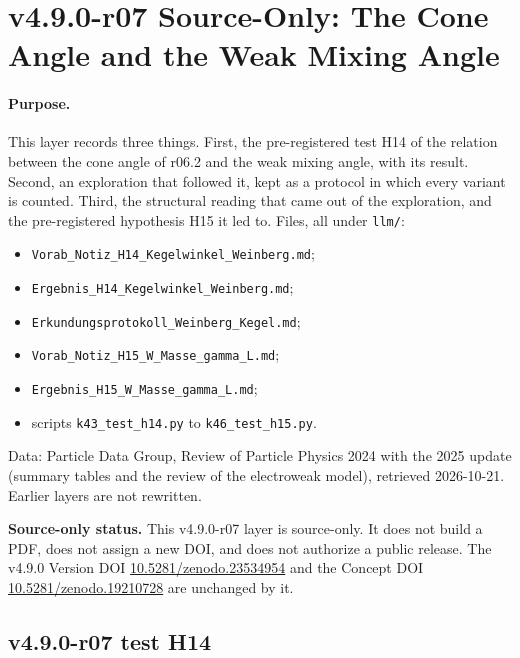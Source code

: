 \clearpage
\section*{v4.9.0-r07 Source-Only: The Cone Angle and the Weak Mixing Angle}
\label{sec:v490-r07-cone-weak-mixing}

\paragraph{Purpose.}
This layer records three things.  First, the pre-registered test H14 of the relation between the cone angle of r06.2 and
the weak mixing angle, with its result.  Second, an exploration that followed it, kept as a protocol in which every
variant is counted.  Third, the structural reading that came out of the exploration, and the pre-registered hypothesis
H15 it led to.  Files, all under \texttt{llm/}:
\begin{itemize}[leftmargin=2em]
\item \texttt{Vorab\_Notiz\_H14\_Kegelwinkel\_Weinberg.md};
\item \texttt{Ergebnis\_H14\_Kegelwinkel\_Weinberg.md};
\item \texttt{Erkundungsprotokoll\_Weinberg\_Kegel.md};
\item \texttt{Vorab\_Notiz\_H15\_W\_Masse\_gamma\_L.md};
\item \texttt{Ergebnis\_H15\_W\_Masse\_gamma\_L.md};
\item scripts \texttt{k43\_test\_h14.py} to \texttt{k46\_test\_h15.py}.
\end{itemize}
Data: Particle Data Group, Review of Particle Physics
2024 with the 2025 update (summary tables and the review of the electroweak model), retrieved 2026-10-21.  Earlier layers
are not rewritten.

\noindent\textbf{Source-only status.}
This v4.9.0-r07 layer is source-only.  It does not build a PDF, does not assign a new DOI,
and does not authorize a public release.  The v4.9.0 Version DOI
\href{https://doi.org/10.5281/zenodo.23534954}{10.5281/zenodo.23534954} and the Concept DOI
\href{https://doi.org/10.5281/zenodo.19210728}{10.5281/zenodo.19210728} are unchanged by it.

\subsection*{v4.9.0-r07 test H14}
\label{subsec:v490-r07-h14}

